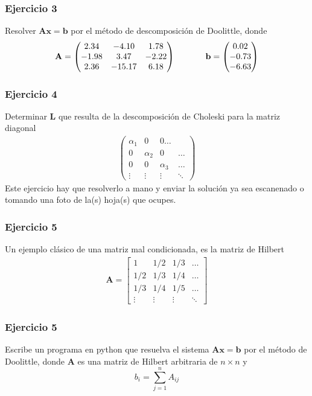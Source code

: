 \begin{frame}
\frametitle{Ejercicio 3}
Resolver $\mathbf{Ax} = \mathbf{b}$ por el método de descomposición de Doolittle, donde
\begin{align*}
\mathbf{A} =
\begin{pmatrix}
2.34 & -4.10 & 1.78 \\
-1.98 & 3.47 & -2.22 \\
2.36 & -15.17 & 6.18 \\
\end{pmatrix} \hspace{1.25cm}
\mathbf{b} =	
\begin{pmatrix}
0.02 \\
-0.73 \\
-6.63
\end{pmatrix}
\end{align*}
\end{frame}
\begin{frame}
\frametitle{Ejercicio 4}
Determinar $\mathbf{L}$ que resulta de la descomposición de Choleski para la matriz diagonal
\begin{align*}
\begin{pmatrix}
\alpha_{1} & 0 & 0 \ldots \\
0 & \alpha_{2} & 0 & \ldots \\
0 & 0 & \alpha_{3} & \ldots \\
\vdots & \vdots &\vdots & \ddots
\end{pmatrix}
\end{align*}
\fontsize{12}{12}\selectfont
Este ejercicio hay que resolverlo a mano y enviar la solución ya sea escanenado o tomando una foto de la(s) hoja(s) que ocupes.
\end{frame}
\begin{frame}
\frametitle{Ejercicio 5}
Un ejemplo clásico de una matriz mal condicionada, es la matriz de Hilbert
\begin{align*}
\mathbf{A} = 
\begin{bmatrix}
1 & 1/2 & 1/3 & \ldots \\
1/2 & 1/3 & 1/4 & \ldots \\
1/3 & 1/4 & 1/5 & \ldots \\
\vdots & \vdots & \vdots & \ddots
\end{bmatrix}
\end{align*}
\end{frame}
\begin{frame}
\frametitle{Ejercicio 5}
Escribe un programa en python que resuelva el sistema $\mathbf{A}\mathbf{x} = \mathbf{b}$ por el método de Doolittle, donde $\mathbf{A}$ es una matriz de Hilbert arbitraria de $n \times n$ y \[ b_{i} = \sum_{j=1}^{n} A_{ij} \]
\end{frame}
